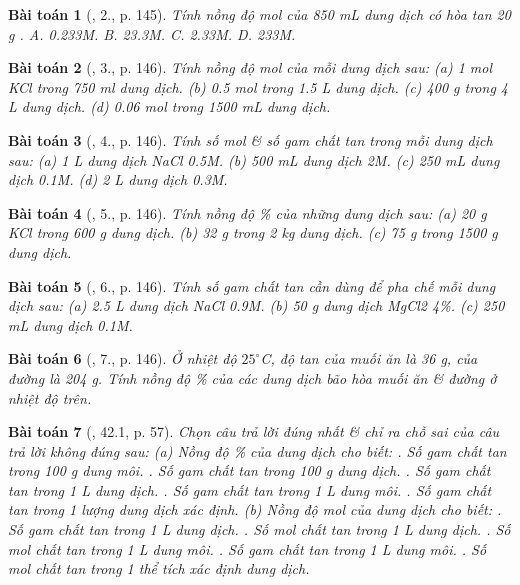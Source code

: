 \documentclass{article}
\newtheorem{baitoan}{Bài toán}
\begin{document}
\begin{baitoan}[\cite{SGK_Hoa_Hoc_8}, 2., p. 145]
	Tính nồng độ mol của \emph{850 mL} dung dịch có hòa tan \emph{20 g }. {\sf A.} \emph{0.233M}. {\sf B.} \emph{23.3M}. {\sf C.} \emph{2.33M}. {\sf D.} \emph{233M}.
\end{baitoan}

\begin{baitoan}[\cite{SGK_Hoa_Hoc_8}, 3., p. 146]
	Tính nồng độ mol của mỗi dung dịch sau: (a) \emph{1 mol KCl} trong \emph{750 ml} dung dịch. (b) \emph{0.5 mol } trong \emph{1.5 L} dung dịch. (c) \emph{400 g } trong \emph{4 L} dung dịch. (d) \emph{0.06 mol } trong \emph{1500 mL} dung dịch.
\end{baitoan}

\begin{baitoan}[\cite{SGK_Hoa_Hoc_8}, 4., p. 146]
	Tính số mol \& số gam chất tan trong mỗi dung dịch sau: (a) \emph{1 L} dung dịch \emph{NaCl 0.5M}. (b) \emph{500 mL} dung dịch \emph{ 2M}. (c) \emph{250 mL} dung dịch \emph{ 0.1M}. (d) \emph{2 L} dung dịch \emph{ 0.3M}.
\end{baitoan}

\begin{baitoan}[\cite{SGK_Hoa_Hoc_8}, 5., p. 146]
	Tính nồng độ \% của những dung dịch sau: (a) \emph{20 g KCl} trong \emph{600 g} dung dịch. (b) \emph{32 g } trong \emph{2 kg} dung dịch. (c) \emph{75 g } trong \emph{1500 g} dung dịch.
\end{baitoan}

\begin{baitoan}[\cite{SGK_Hoa_Hoc_8}, 6., p. 146]
	Tính số gam chất tan cần dùng để pha chế mỗi dung dịch sau: (a) \emph{2.5 L} dung dịch \emph{NaCl 0.9M}. (b) \emph{50 g} dung dịch \emph{MgCl2 4\%}. (c) \emph{250 mL} dung dịch \emph{ 0.1M}.
\end{baitoan}

\begin{baitoan}[\cite{SGK_Hoa_Hoc_8}, 7., p. 146]
	Ở nhiệt độ $25^\circ$\emph{C}, độ tan của muối ăn là \emph{36 g}, của đường là \emph{204 g}. Tính nồng độ \% của các dung dịch bão hòa muối ăn \& đường ở nhiệt độ trên.
\end{baitoan}

\begin{baitoan}[\cite{SBT_Hoa_Hoc_8}, 42.1, p. 57]
	Chọn câu trả lời đúng nhất \& chỉ ra chỗ sai của câu trả lời không đúng sau: (a) Nồng độ \% của dung dịch cho biết: {.} Số gam chất tan trong \emph{100 g} dung môi. {.} Số gam chất tan trong \emph{100 g} dung dịch. {.} Số gam chất tan trong \emph{1 L} dung dịch. {.} Số gam chất tan trong \emph{1 L} dung môi. {.} Số gam chất tan trong 1 lượng dung dịch xác định. (b) Nồng độ mol của dung dịch cho biết: {.} Số gam chất tan trong \emph{1 L} dung dịch. {.} Số mol chất tan trong \emph{1 L} dung dịch. {.} Số mol chất tan trong \emph{1 L} dung môi. {.} Số gam chất tan trong \emph{1 L} dung môi. {.} Số mol chất tan trong 1 thể tích xác định dung dịch.
\end{baitoan}
\end{document}
